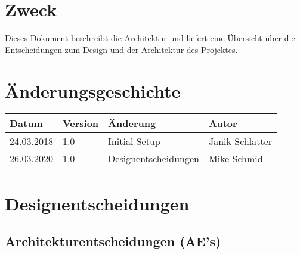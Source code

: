 \documentclass[
	ngerman,
	toc=listof, %
	toc=bibliography, %
	footnotes=multiple, %
	parskip=half, %
	numbers=noendperiod %
]{scrartcl}
\newcommand{\vorlagenOrdner}{../../99_Vorlagen} %
\begin{document}
\thispagestyle{plain}

\cleardoublepage


\section*{Zweck}
Dieses Dokument beschreibt die Architektur und liefert eine Übersicht über die Entscheidungen zum Design und der Architektur des Projektes.

\section*{Änderungsgeschichte}
\begin{tabularx}{\textwidth}{llXl}
	\toprule
	Datum & Version & Änderung & Autor \\
	\midrule
	24.03.2018 & 1.0 & Initial Setup & Janik Schlatter \\
	26.03.2020 & 1.0 & Designentscheidungen & Mike Schmid \\
	\bottomrule
\end{tabularx}
\cleardoublepage

{}
\tableofcontents
\cleardoublepage

\let\stdsection\section
\renewcommand\section{\clearpage\stdsection}

\section{Designentscheidungen}
	\subsection{Architekturentscheidungen (AE's)}
\end{document}
